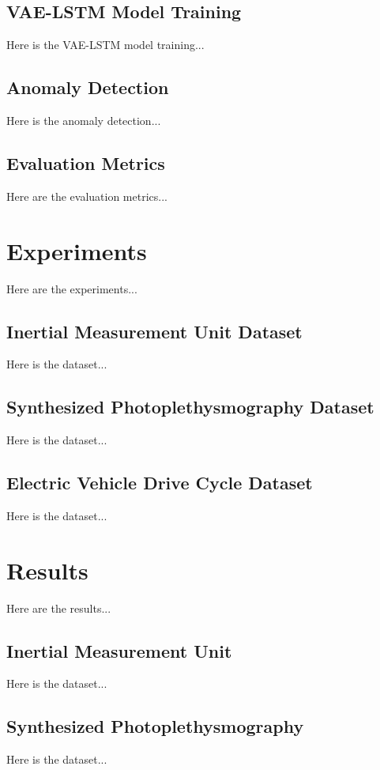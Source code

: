 \documentclass[conference]{IEEEtran}
\begin{document}
\subsection{VAE-LSTM Model Training}
Here is the VAE-LSTM model training...

\subsection{Anomaly Detection}
Here is the anomaly detection...

\subsection{Evaluation Metrics}
Here are the evaluation metrics...


\section{Experiments}
Here are the experiments...

\subsection{Inertial Measurement Unit Dataset}
Here is the dataset...

\subsection{Synthesized Photoplethysmography Dataset}
Here is the dataset...

\subsection{Electric Vehicle Drive Cycle Dataset}
Here is the dataset...


\section{Results}
Here are the results...

\subsection{Inertial Measurement Unit}
Here is the dataset...

\subsection{Synthesized Photoplethysmography}
Here is the dataset...
\end{document}
